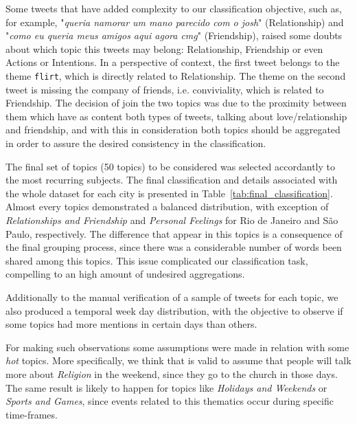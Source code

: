 Some tweets that have added complexity to our classification objective, such as, for example, "\textit{queria namorar um mano parecido com o josh}" (Relationship) and "\textit{como eu queria meus amigos aqui agora cmg}" (Friendship), raised some doubts about which topic this tweets may belong: Relationship, Friendship or even Actions or Intentions. In a perspective of context, the first tweet belongs to the theme \texttt{flirt}, which is directly related to Relationship. The theme on the second tweet is missing the company of friends, i.e. conviviality, which is related to Friendship. The decision of join the two topics was due to the proximity between them which have as content both types of tweets, talking about love/relationship and friendship, and with this in consideration both topics should be aggregated in order to assure the desired consistency in the classification.

The final set of topics (50 topics) to be considered was selected accordantly to the most recurring subjects. The final classification and details associated with the whole dataset for each city is presented in Table~\ref{tab:final_classification}. Almost every topics demonstrated a balanced distribution, with exception of \textit{Relationships and Friendship} and \textit{Personal Feelings} for Rio de Janeiro and São Paulo, respectively. The difference that appear in this topics is a consequence of the final grouping process, since there was a considerable number of words been shared among this topics. This issue complicated our classification task, compelling to an high amount of undesired aggregations.
		
Additionally to the manual verification of a sample of tweets for each topic, we also produced a temporal week day distribution,  with the objective to observe if some topics had more mentions in certain days than others.

For making such observations some assumptions were made in relation with some \textit{hot} topics. More specifically, we think that is valid to assume that people will talk more about \textit{Religion} in the weekend, since they go to the church in those days. The same result is likely to happen for topics like \textit{Holidays and Weekends} or \textit{Sports and Games}, since events related to this thematics occur during specific time-frames.

